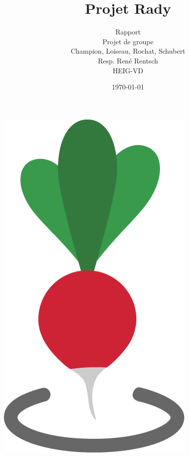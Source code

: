 \documentclass[french]{article}
\begin{document}
	
	
	\title{Projet Rady} %
	\author{Rapport\\ 
		Projet de groupe\\
		Champion, Loiseau, Rochat, Schubert\\
		Resp. René Rentsch\\
		HEIG-VD}
	\date{\today} %
	\maketitle
	\vspace{2cm}
	\centering
	\includegraphics[scale=0.3]{../logo/icone}
	\thispagestyle{empty}
	
	\newpage
	\thispagestyle{empty}
	$ $
	\newpage
	
	\justify
	\normalsize
	
	\tableofcontents
	
\end{document}
